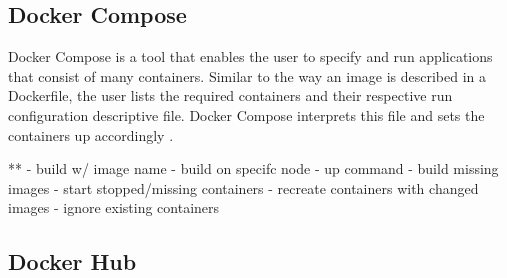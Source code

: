   \subsection{Docker Compose} %
  \label{sub:docker_compose}
    Docker Compose is a tool that enables the user to specify and run applications that consist of many containers. Similar to the way an image is described in a Dockerfile, the user lists the required containers and their respective run configuration descriptive file. Docker Compose interprets this file and sets the containers up accordingly \cite{Docker????Dockerb}.


    **  - build w/ image name
        - build on specifc node
        - up command
          - build missing images
          - start stopped/missing containers
          - recreate containers with changed images
          - ignore existing containers


  \subsection{Docker Hub} %
  \label{sub:docker_hub}


